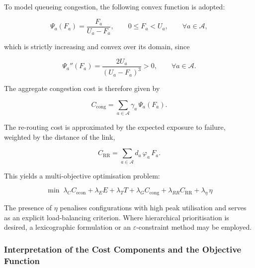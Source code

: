 \documentclass[a4paper,fleqn]{cas-dc}
\newcommand{\A}{\mathcal{A}}
\begin{document}
To model queueing congestion, the following convex function is adopted:

\begin{equation}
\Psi_a(F_a)=\frac{F_a}{U_a-F_a},
\qquad 0\le F_a < U_a,
\qquad \forall a\in\A,
\end{equation}

which is strictly increasing and convex over its domain, since

\begin{equation}
\Psi_a''(F_a)=\frac{2U_a}{(U_a-F_a)^3}>0,
\qquad \forall a\in\A.
\end{equation}

The aggregate congestion cost is therefore given by

\begin{equation}
C_{\mathrm{cong}} = \sum_{a\in\A} \gamma_a\,\Psi_a(F_a).
\end{equation}

The re-routing cost is approximated by the expected exposure to failure, weighted by the distance of the link,

\begin{equation}
C_{\mathrm{RR}} = \sum_{a\in\A} d_a\,\varphi_a\,F_a.
\end{equation}


This yields a multi-objective optimisation problem:

\begin{equation}
\min \; \lambda_C C_{\mathrm{econ}}
+ \lambda_E E
+ \lambda_T T
+ \lambda_G C_{\mathrm{cong}}
+ \lambda_{RR} C_{\mathrm{RR}}
+ \lambda_{\eta}\,\eta
\end{equation}


The presence of \(\eta\) penalises configurations with high peak utilisation and serves as an explicit load-balancing criterion. Where hierarchical prioritisation is desired, a lexicographic formulation or an \(\varepsilon\)-constraint method may be employed.


\subsubsection*{Interpretation of the Cost Components and the Objective Function}
\end{document}
